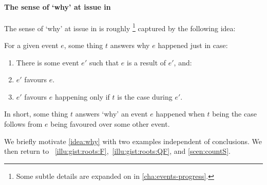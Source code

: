 \paragraph*{The sense of `why' at issue in \qWhy{}}


\begin{note}
  The sense of `why' at issue in \qWhy{} is roughly%
  \footnote{
    Some subtle details are expanded on in \autoref{cha:events-progress}.
  }
  captured by the following idea:

  \begin{idea}[`Why']%
    \label{idea:why}%
    For a given event \(e\), some thing \(t\) answers why \(e\) happened just in case:
    \begin{enumerate}[label=\Alph*., ref=\Alph*]
    \item
      \label{idea:why:result}
      There is some event \(e'\) such that \(e\) is a result of \(e'\), and:
    \item
      \label{idea:why:favour}
      \(e'\) favours \(e\).
    \item
      \label{idea:why:feat}
      \(e'\) favours \(e\) happening only if \(t\) is the case during \(e'\).
    \end{enumerate}
    \vspace{-\baselineskip}
  \end{idea}

  \noindent%
  In short, some thing \(t\) answers `why' an event \(e\) happened when \(t\) being the case follows from \(e\) being favoured over some other event.
\end{note}


\begin{note}
  We briefly motivate \autoref{idea:why} with two examples independent of conclusions.
  We then return to ~\ref{illu:gist:roots:F},~\ref{illu:gist:roots:QF}, and \ref{scen:countS}.
\end{note}


